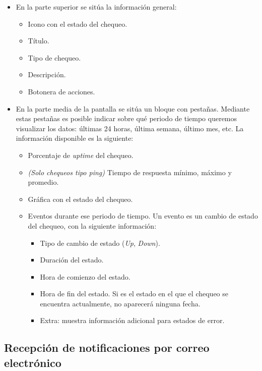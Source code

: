 \begin{itemize}
\item En la parte superior se sitúa la información general:
  \begin{itemize}
  \item Icono con el estado del chequeo.
  \item Título.
  \item Tipo de chequeo.
  \item Descripción.
  \item Botonera de acciones.
  \end{itemize}

\item En la parte media de la pantalla se sitúa un bloque con pestañas. Mediante
  estas pestañas es posible indicar sobre qué periodo de tiempo queremos
  visualizar los datos: últimas 24 horas, última semana, último mes, etc. La
  información disponible es la siguiente:

  \begin{itemize}
  \item Porcentaje de \textit{uptime} del chequeo.
  \item \textit{(Solo chequeos tipo ping)} Tiempo de respuesta mínimo, máximo y promedio.
  \item Gráfica con el estado del chequeo.
  \item Eventos durante ese periodo de tiempo. Un evento es un cambio de estado
    del chequeo, con la siguiente información:
    \begin{itemize}
    \item Tipo de cambio de estado (\textit{Up}, \textit{Down}).
    \item Duración del estado.
    \item Hora de comienzo del estado.
    \item Hora de fin del estado. Si es el estado en el que el chequeo se
      encuentra actualmente, no aparecerá ninguna fecha.
    \item Extra: muestra información adicional para estados de error.
    \end{itemize}
  \end{itemize}

\end{itemize}

\subsection{Recepción de notificaciones por correo electrónico}

